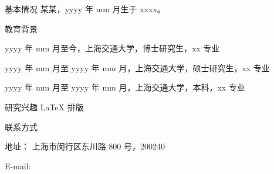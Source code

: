 \begin{resume}
  \begin{resumesection}{基本情况}
    某某，yyyy 年 mm 月生于 xxxx。
  \end{resumesection}

  \begin{resumelist}{教育背景}
    \item yyyy 年 mm 月至今，上海交通大学，博士研究生，xx 专业
    \item yyyy 年 mm 月至 yyyy 年 mm 月，上海交通大学，硕士研究生，xx 专业
    \item yyyy 年 mm 月至 yyyy 年 mm 月，上海交通大学，本科，xx 专业
  \end{resumelist}

  \begin{resumesection}{研究兴趣}
    \LaTeX{} 排版
  \end{resumesection}

  \begin{resumelist}{联系方式}
    \item 地址： 上海市闵行区东川路 800 号，200240
    \item E-mail: 
  \end{resumelist}
\end{resume}

